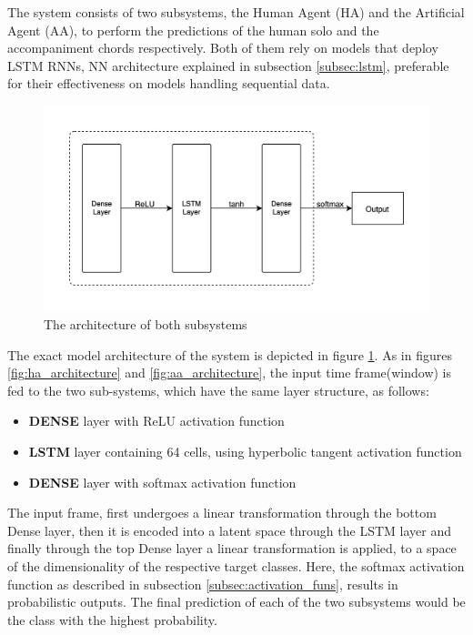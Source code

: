         The system consists of two subsystems, the Human Agent (HA) and the Artificial Agent (AA), to perform the predictions of the human solo and the accompaniment chords respectively. Both of them rely on models that deploy LSTM RNNs, NN architecture explained in subsection \ref{subsec:lstm}, preferable for their effectiveness on models handling sequential data.
        
        \begin{figure}[h]
        \centering
        \includegraphics[width=1\textwidth]{media/overall_layers_with_funs.jpg}
        \caption{The architecture of both subsystems}
        \label{fig:system_architecture}
        \end{figure}
        

        The exact model architecture of the system is depicted in figure \ref{fig:system_architecture}. As in figures \ref{fig:ha_architecture} and \ref{fig:aa_architecture}, the input time frame(window) is fed to the two sub-systems, which have the same layer structure, as follows:
        \begin{itemize}
            \item \textbf{DENSE} layer with ReLU activation function
            \item \textbf{LSTM} layer containing 64 cells, using hyperbolic tangent activation function
            \item \textbf{DENSE} layer with softmax activation function
        \end{itemize}
        

        The input frame, first undergoes a linear transformation through the bottom Dense layer, then it is encoded into a latent space through the LSTM layer and finally through the top Dense layer a linear transformation is applied, to a space of the dimensionality of the respective target classes. Here, the softmax activation function as described in subsection \ref{subsec:activation_funs}, results in probabilistic outputs. The final prediction of each of the two subsystems would be the class with the highest probability.

